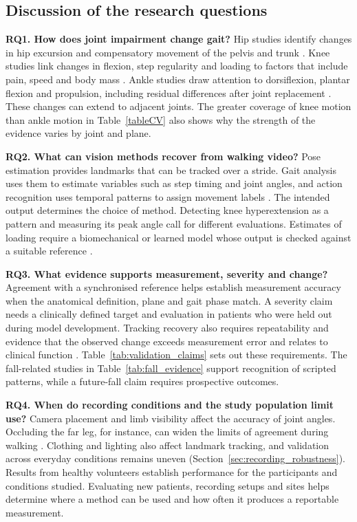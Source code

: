 \subsection{Discussion of the research questions}
\label{sec:rq_discussion}

\noindent\textbf{RQ1. How does joint impairment change gait?}
Hip studies identify changes in hip excursion and compensatory movement of the pelvis and trunk \cite{eitzen2012sagittal,reininga2012subjects}. Knee studies link changes in flexion, step regularity and loading to factors that include pain, speed and body mass \cite{kaufman2001gait,harding2012body,bacon2022relation}. Ankle studies draw attention to dorsiflexion, plantar flexion and propulsion, including residual differences after joint replacement \cite{valderrabano2007gait,schmitt2015effect}. These changes can extend to adjacent joints. The greater coverage of knee motion than ankle motion in Table~\ref{tableCV} also shows why the strength of the evidence varies by joint and plane.

\noindent\textbf{RQ2. What can vision methods recover from walking video?}
Pose estimation provides landmarks that can be tracked over a stride. Gait analysis uses them to estimate variables such as step timing and joint angles, and action recognition uses temporal patterns to assign movement labels \cite{stenum2021two,lv2022analysis,rohan2020human}. The intended output determines the choice of method. Detecting knee hyperextension as a pattern and measuring its peak angle call for different evaluations. Estimates of loading require a biomechanical or learned model whose output is checked against a suitable reference \cite{boswell2021neural}.

\noindent\textbf{RQ3. What evidence supports measurement, severity and change?}
Agreement with a synchronised reference helps establish measurement accuracy when the anatomical definition, plane and gait phase match. A severity claim needs a clinically defined target and evaluation in patients who were held out during model development. Tracking recovery also requires repeatability and evidence that the observed change exceeds measurement error and relates to clinical function \cite{stenum2024clinical,schoenwether2025reliability}. Table~\ref{tab:validation_claims} sets out these requirements. The fall-related studies in Table~\ref{tab:fall_evidence} support recognition of scripted patterns, while a future-fall claim requires prospective outcomes.

\noindent\textbf{RQ4. When do recording conditions and the study population limit use?}
Camera placement and limb visibility affect the accuracy of joint angles. Occluding the far leg, for instance, can widen the limits of agreement during walking \cite{wade2023examination}. Clothing and lighting also affect landmark tracking, and validation across everyday conditions remains uneven (Section~\ref{sec:recording_robustness}). Results from healthy volunteers establish performance for the participants and conditions studied. Evaluating new patients, recording setups and sites helps determine where a method can be used and how often it produces a reportable measurement.
